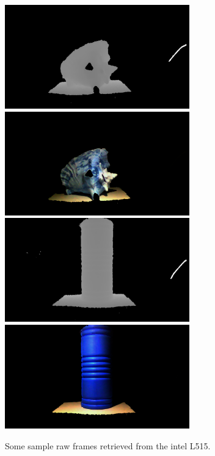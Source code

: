 \documentclass[final]{cvpr}
\begin{document}
\begin{figure}
\centering
\includegraphics[width=8cm]{conch_depth_frame_sample}
\includegraphics[width=8cm]{conch_sample}
\includegraphics[width=8cm]{roller_depth_frame_sample}
\includegraphics[width=8cm]{roller_img_sample}	
\caption{Some sample raw frames retrieved from the intel L515.}
\end{figure}

{\small


}
\end{document}

